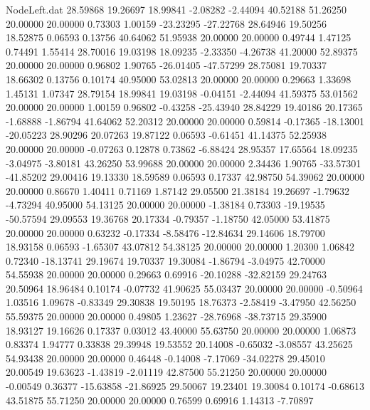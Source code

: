 \begin{filecontents}{NodeLeft.dat}
  28.59868   19.26697   18.99841    -2.08282   -2.44094   40.52188   51.26250   20.00000   20.00000    0.73303    1.00159  -23.23295  -27.22768
  28.64946   19.50256   18.52875     0.06593    0.13756   40.64062   51.95938   20.00000   20.00000    0.49744    1.47125    0.74491    1.55414
  28.70016   19.03198   18.09235    -2.33350   -4.26738   41.20000   52.89375   20.00000   20.00000    0.96802    1.90765  -26.01405  -47.57299
  28.75081   19.70337   18.66302     0.13756    0.10174   40.95000   53.02813   20.00000   20.00000    0.29663    1.33698    1.45131    1.07347
  28.79154   18.99841   19.03198    -0.04151   -2.44094   41.59375   53.01562   20.00000   20.00000    1.00159    0.96802   -0.43258  -25.43940
  28.84229   19.40186   20.17365    -1.68888   -1.86794   41.64062   52.20312   20.00000   20.00000    0.59814   -0.17365  -18.13001  -20.05223
  28.90296   20.07263   19.87122     0.06593   -0.61451   41.14375   52.25938   20.00000   20.00000   -0.07263    0.12878    0.73862   -6.88424
  28.95357   17.65564   18.09235    -3.04975   -3.80181   43.26250   53.99688   20.00000   20.00000    2.34436    1.90765  -33.57301  -41.85202
  29.00416   19.13330   18.59589     0.06593    0.17337   42.98750   54.39062   20.00000   20.00000    0.86670    1.40411    0.71169    1.87142
  29.05500   21.38184   19.26697    -1.79632   -4.73294   40.95000   54.13125   20.00000   20.00000   -1.38184    0.73303  -19.19535  -50.57594
  29.09553   19.36768   20.17334    -0.79357   -1.18750   42.05000   53.41875   20.00000   20.00000    0.63232   -0.17334   -8.58476  -12.84634
  29.14606   18.79700   18.93158     0.06593   -1.65307   43.07812   54.38125   20.00000   20.00000    1.20300    1.06842    0.72340  -18.13741
  29.19674   19.70337   19.30084    -1.86794   -3.04975   42.70000   54.55938   20.00000   20.00000    0.29663    0.69916  -20.10288  -32.82159
  29.24763   20.50964   18.96484     0.10174   -0.07732   41.90625   55.03437   20.00000   20.00000   -0.50964    1.03516    1.09678   -0.83349
  29.30838   19.50195   18.76373    -2.58419   -3.47950   42.56250   55.59375   20.00000   20.00000    0.49805    1.23627  -28.76968  -38.73715
  29.35900   18.93127   19.16626     0.17337    0.03012   43.40000   55.63750   20.00000   20.00000    1.06873    0.83374    1.94777    0.33838
  29.39948   19.53552   20.14008    -0.65032   -3.08557   43.25625   54.93438   20.00000   20.00000    0.46448   -0.14008   -7.17069  -34.02278
  29.45010   20.00549   19.63623    -1.43819   -2.01119   42.87500   55.21250   20.00000   20.00000   -0.00549    0.36377  -15.63858  -21.86925
  29.50067   19.23401   19.30084     0.10174   -0.68613   43.51875   55.71250   20.00000   20.00000    0.76599    0.69916    1.14313   -7.70897

\end{filecontents}
